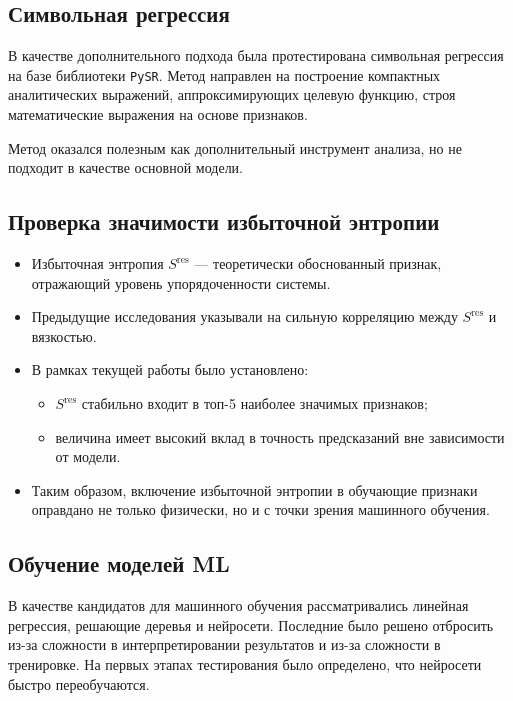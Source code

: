 \documentclass[a4paper,12pt]{article}
\begin{document}
  \subsection{Символьная регрессия}

    В качестве дополнительного подхода была протестирована символьная регрессия на базе библиотеки \texttt{PySR}. Метод направлен на построение компактных аналитических выражений, аппроксимирующих целевую функцию, строя математические выражения на основе признаков.

    Метод оказался полезным как дополнительный инструмент анализа, но не подходит в качестве основной модели.

  \subsection{Проверка значимости избыточной энтропии}

    \begin{itemize}
      \item Избыточная энтропия $S^{\text{res}}$ — теоретически обоснованный признак, отражающий уровень упорядоченности системы.
      \item Предыдущие исследования указывали на сильную корреляцию между $S^{\text{res}}$ и вязкостью.
      \item В рамках текущей работы было установлено:
      \begin{itemize}
        \item $S^{\text{res}}$ стабильно входит в топ-5 наиболее значимых признаков;
        \item величина имеет высокий вклад в точность предсказаний вне зависимости от модели.
      \end{itemize}
      \item Таким образом, включение избыточной энтропии в обучающие признаки оправдано не только физически, но и с точки зрения машинного обучения.
    \end{itemize}

  \subsection{Обучение моделей ML}
    В качестве кандидатов для машинного обучения рассматривались линейная регрессия, решающие деревья и нейросети. Последние было решено отбросить из-за сложности в интерпретировании результатов и из-за сложности в тренировке. На первых этапах тестирования было определено, что нейросети быстро переобучаются.
\end{document}
